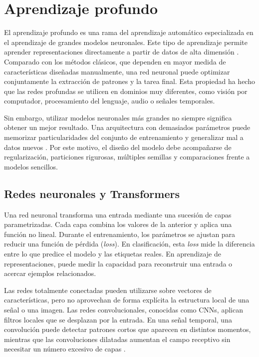 \section{Aprendizaje profundo}

El aprendizaje profundo es una rama del aprendizaje automático especializada en el aprendizaje de grandes modelos neuronales. Este tipo de aprendizaje permite aprender representaciones directamente a partir de datos de alta dimensión \cite{lecun2015deep}. Comparado con los métodos clásicos, que dependen en mayor medida de características diseñadas manualmente, una red neuronal puede optimizar conjuntamente la extracción de patrones y la tarea final. Esta propiedad ha hecho que las redes profundas se utilicen en dominios muy diferentes, como visión por computador, procesamiento del lenguaje, audio o señales temporales.

Sin embargo, utilizar modelos neuronales más grandes no siempre significa obtener un mejor resultado. Una arquitectura con demasiados parámetros puede memorizar particularidades del conjunto de entrenamiento y generalizar mal a datos nuevos \cite{zhang2017rethinking}. Por este motivo, el diseño del modelo debe acompañarse de regularización, particiones rigurosas, múltiples semillas y comparaciones frente a modelos sencillos.

\subsection{Redes neuronales y Transformers}

Una red neuronal transforma una entrada mediante una sucesión de capas parametrizadas. Cada capa combina los valores de la anterior y aplica una función no lineal. Durante el entrenamiento, los parámetros se ajustan para reducir una función de pérdida (\textit{loss}). En clasificación, esta \textit{loss} mide la diferencia entre lo que predice el modelo y las etiquetas reales. En aprendizaje de representaciones, puede medir la capacidad para reconstruir una entrada o acercar ejemplos relacionados.

Las redes totalmente conectadas pueden utilizarse sobre vectores de características, pero no aprovechan de forma explícita la estructura local de una señal o una imagen. Las redes convolucionales, conocidas como CNNs, aplican filtros locales que se desplazan por la entrada. En una señal temporal, una convolución puede detectar patrones cortos que aparecen en distintos momentos, mientras que las convoluciones dilatadas aumentan el campo receptivo sin necesitar un número excesivo de capas \cite{defossez2023speech,dascoli2025words}.

